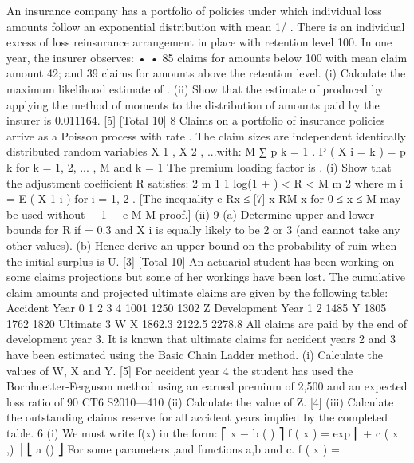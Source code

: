 \documentclass[a4paper,12pt]{article}
\begin{document}
An insurance company has a portfolio of policies under which individual loss amounts follow an exponential distribution with mean 1/ \lambda  . There is an individual excess of loss reinsurance arrangement in place with retention level 100. In one year,
the insurer observes:
•
•
85 claims for amounts below 100 with mean claim amount 42; and
39 claims for amounts above the retention level.
(i) Calculate the maximum likelihood estimate of \lambda  .
(ii) Show that the estimate of \lambda  produced by applying the method of moments to
the distribution of amounts paid by the insurer is 0.011164.
[5]
[Total 10]
8
Claims on a portfolio of insurance policies arrive as a Poisson process with rate \lambda  .
The claim sizes are independent identically distributed random variables
X 1 , X 2 , ...with:
M
∑ p k = 1 .
P ( X i = k ) = p k for k = 1, 2, ... , M and
k = 1
The premium loading factor is \theta .
(i)
Show that the adjustment coefficient R satisfies:
2 \theta  m 1
1
log(1 + \theta  ) < R <
M
m 2
where m i = E ( X 1 i ) for i = 1, 2 .
[The inequality e Rx ≤
[7]
x RM
x
for 0 ≤ x ≤ M may be used without
+ 1 −
e
M
M
proof.]
(ii)
9
(a) Determine upper and lower bounds for R if \theta  = 0.3 and X i is equally likely to be 2 or 3 (and cannot take any other values).
(b) Hence derive an upper bound on the probability of ruin when the initial
surplus is U.
[3]
[Total 10]
An actuarial student has been working on some claims projections but some of her workings have been lost. The cumulative claim amounts and projected ultimate
claims are given by the following table:
Accident
Year 0
1
2
3
4 1001
1250
1302
Z
Development Year
1
2
1485
Y
1805
1762
1820
Ultimate
3
W
X
1862.3
2122.5
2278.8
All claims are paid by the end of development year 3.
It is known that ultimate claims for accident years 2 and 3 have been estimated using the Basic Chain Ladder method.
(i)
Calculate the values of W, X and Y.
[5]
For accident year 4 the student has used the Bornhuetter-Ferguson method using an earned premium of 2,500 and an expected loss ratio of 90%
CT6 S2010—410
(ii) Calculate the value of Z.
[4]
(iii) Calculate the outstanding claims reserve for all accident years implied by the completed table.
6
(i)
We must write f(x) in the form:
⎡ x \theta  − b ( \theta  )
⎤
f ( x ) = exp ⎢
+ c ( x ,\phi  ) ⎥
⎣ a (\phi  )
⎦
For some parameters \theta  ,\phi  and functions a,b and c.
\alpha  \alpha 
f ( x ) =
\end{document}
